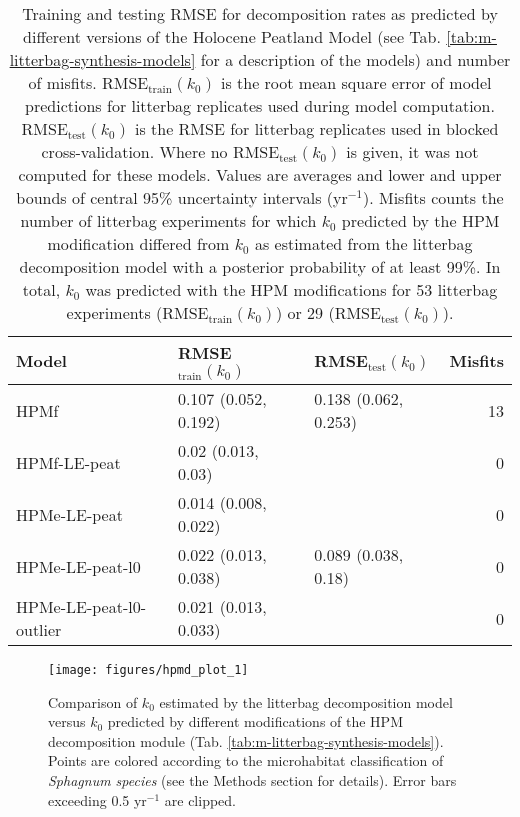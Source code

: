 \documentclass[
  12pt,
]{article}
\begin{document}
\begin{table}[!h]

\caption{\label{tab:out-tab-sdm-all-models-rmse-1}Training and testing RMSE for decomposition rates as predicted by different versions of the Holocene Peatland Model (see Tab. \ref{tab:m-litterbag-synthesis-models} for a description of the models) and number of misfits. RMSE\(_\text{train}(k_0)\) is the root mean square error of model predictions for litterbag replicates used during model computation. RMSE\(_\text{test}(k_0)\) is the RMSE for litterbag replicates used in blocked cross-validation. Where no RMSE\(_\text{test}(k_0)\) is given, it was not computed for these models. Values are averages and lower and upper bounds of central 95\% uncertainty intervals (yr\(^{-1}\)). Misfits counts the number of litterbag experiments for which \(k_0\) predicted by the HPM modification differed from \(k_0\) as estimated from the litterbag decomposition model with a posterior probability of at least 99\%. In total, \(k_0\) was predicted with the HPM modifications for 53 litterbag experiments (RMSE\(_\text{train}(k_0)\)) or 29 (RMSE\(_\text{test}(k_0)\)).}
\centering
\begin{tabular}[t]{lllr}
\toprule
Model & RMSE$_\text{train}(k_0)$ & RMSE$_\text{test}(k_0)$ & Misfits\\
\midrule
HPMf & 0.107 (0.052, 0.192) & 0.138 (0.062, 0.253) & 13\\
HPMf-LE-peat & 0.02 (0.013, 0.03) &  & 0\\
HPMe-LE-peat & 0.014 (0.008, 0.022) &  & 0\\
HPMe-LE-peat-l0 & 0.022 (0.013, 0.038) & 0.089 (0.038, 0.18) & 0\\
HPMe-LE-peat-l0-outlier & 0.021 (0.013, 0.033) &  & 0\\
\bottomrule
\end{tabular}
\end{table}



\begin{figure}[H]

{\centering \texttt{[image: figures/hpmd\_plot\_1]} 

}

\caption{Comparison of \(k_0\) estimated by the litterbag decomposition model versus \(k_0\) predicted by different modifications of the HPM decomposition module (Tab. \ref{tab:m-litterbag-synthesis-models}). Points are colored according to the microhabitat classification of \emph{Sphagnum species} (see the Methods section for details). Error bars exceeding 0.5 yr\(^{-1}\) are clipped.}\label{fig:out-p-hpm-mm27-2-mm29-1-mm30-1-p1}
\end{figure}
\end{document}
